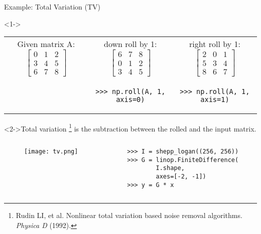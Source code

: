 \begin{frame}[fragile]{Example: Total Variation (TV)}

\begin{block}<1->{}
{\large
\begin{center}
	\begin{tabular}{ c | c | c }
		Given matrix A: $\begin{bmatrix}
			0 & 1 & 2 \\
			3 & 4 & 5 \\
			6 & 7 & 8
		\end{bmatrix}$ & 
		down roll by 1: $\begin{bmatrix}
			6 & 7 & 8 \\
			0 & 1 & 2 \\
			3 & 4 & 5
		\end{bmatrix}$ & 
		right roll by 1: $\begin{bmatrix}
			2 & 0 & 1 \\
			5 & 3 & 4 \\
			8 & 6 & 7
		\end{bmatrix}$ \\
	 	& 
\begin{lstlisting}
>>> np.roll(A, 1, axis=0)
\end{lstlisting} & 
\begin{lstlisting}
>>> np.roll(A, 1, axis=1)
\end{lstlisting}
	\end{tabular}
\end{center}}
\end{block}

\begin{block}<2->{Total variation \footnote{Rudin LI, et al. Nonlinear total variation based noise removal algorithms. \textit{Physica D} (1992).} is the subtraction 
		between the rolled and the input matrix.}
\begin{columns}
\begin{column}{0.55\textwidth}
	\begin{figure}
		\texttt{[image: tv.png]}
	\end{figure}
\end{column}

\begin{column}{0.45\textwidth}
\begin{lstlisting}
>>> I = shepp_logan((256, 256))
>>> G = linop.FiniteDifference(
		I.shape,
		axes=[-2, -1])
>>> y = G * x
\end{lstlisting}
\end{column}

\end{columns}
\end{block}

\end{frame}


